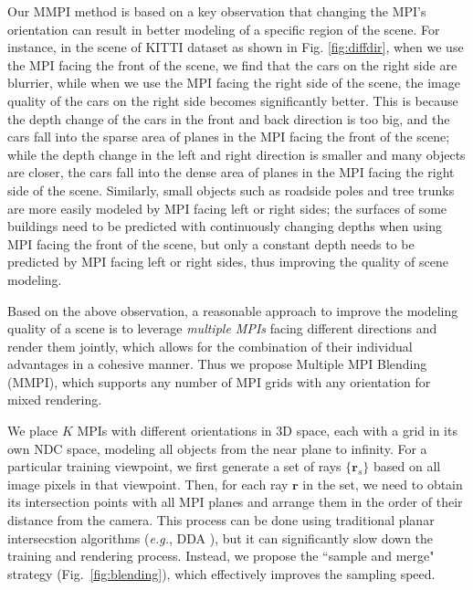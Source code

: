 \documentclass[letterpaper, 10 pt, conference]{ieeeconf}  %
\begin{document}
Our MMPI method is based on a key observation that changing the MPI's orientation can result in better modeling of a specific region of the scene. For instance, in the scene of KITTI dataset as shown in Fig. \ref{fig:diffdir}, when we use the MPI facing the front of the scene, we find that the cars on the right side are blurrier, while when we use the MPI facing the right side of the scene, the image quality of the cars on the right side becomes significantly better. This is because the depth change of the cars in the front and back direction is too big, and the cars fall into the sparse area of planes in the MPI facing the front of the scene; while the depth change in the left and right direction is smaller and many objects are closer, the cars fall into the dense area of planes in the MPI facing the right side of the scene. Similarly, small objects such as roadside poles and tree trunks are more easily modeled by MPI facing left or right sides; the surfaces of some buildings need to be predicted with continuously changing depths when using MPI facing the front of the scene, but only a constant depth needs to be predicted by MPI facing left or right sides, thus improving the quality of scene modeling.

Based on the above observation, a reasonable approach to improve the modeling quality of a scene is to leverage {\it multiple MPIs} facing different directions and render them jointly, which allows for the combination of their individual advantages in a cohesive manner. Thus we propose Multiple MPI Blending (MMPI), which supports any number of MPI grids with any orientation for mixed rendering.

We place $K$ MPIs with different orientations in 3D space, each with a grid in its own NDC space, modeling all objects from the near plane to infinity. For a particular training viewpoint, we first generate a set of rays $\{ \mathbf{r}_s \}$ based on all image pixels in that viewpoint. Then, for each ray $\mathbf{r}$ in the set, we need to obtain its intersection points with all MPI planes and arrange them in the order of their distance from the camera. This process can be done using traditional planar intersecstion algorithms (\textit{e.g.}, DDA \cite{marschner2018fundamentals}), but it can significantly slow down the training and rendering process. Instead, we propose the ``sample and merge" strategy (Fig.~\ref{fig:blending}), which effectively improves the sampling speed.
\end{document}
